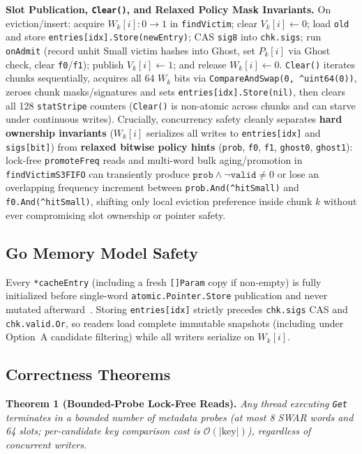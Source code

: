 \documentclass[11pt,a4paper]{article}
\begin{document}
\textbf{Slot Publication, \texttt{Clear()}, and Relaxed Policy Mask Invariants.} On eviction/insert: acquire $W_k[i]: 0 \to 1$ in \texttt{findVictim}; clear $V_k[i]\leftarrow 0$; load \texttt{old} and store \texttt{entries[idx].Store(newEntry)}; CAS \texttt{sig8} into \texttt{chk.sigs}; run \texttt{onAdmit} (record unhit Small victim hashes into Ghost, set $P_k[i]$ via Ghost check, clear \texttt{f0}/\texttt{f1}); publish $V_k[i]\leftarrow 1$; and release $W_k[i]\leftarrow 0$. \texttt{Clear()} iterates chunks sequentially, acquires all 64 $W_k$ bits via \texttt{CompareAndSwap(0, \textasciicircum uint64(0))}, zeroes chunk masks/signatures and sets \texttt{entries[idx].Store(nil)}, then clears all 128 \texttt{statStripe} counters (\texttt{Clear()} is non-atomic across chunks and can starve under continuous writes). Crucially, concurrency safety cleanly separates \textbf{hard ownership invariants} ($W_k[i]$ serializes all writes to \texttt{entries[idx]} and \texttt{sigs[bit]}) from \textbf{relaxed bitwise policy hints} (\texttt{prob}, \texttt{f0}, \texttt{f1}, \texttt{ghost0}, \texttt{ghost1}): lock-free \texttt{promoteFreq} reads and multi-word bulk aging/promotion in \texttt{findVictimS3FIFO} can transiently produce $\texttt{prob} \land \neg \texttt{valid} \ne 0$ or lose an overlapping frequency increment between \texttt{prob.And(\textasciicircum hitSmall)} and \texttt{f0.And(\textasciicircum hitSmall)}, shifting only local eviction preference inside chunk $k$ without ever compromising slot ownership or pointer safety.

\subsection{Go Memory Model Safety}
Every \texttt{*cacheEntry} (including a fresh \texttt{[]Param} copy if non-empty) is fully initialized before single-word \texttt{atomic.Pointer.Store} publication and never mutated afterward~\cite{gomem2024}. Storing \texttt{entries[idx]} strictly precedes \texttt{chk.sigs} CAS and \texttt{chk.valid.Or}, so readers load complete immutable snapshots (including under Option~A candidate filtering) while all writers serialize on $W_k[i]$.

\subsection{Correctness Theorems}

\textbf{Theorem 1 (Bounded-Probe Lock-Free Reads).} \textit{Any thread executing \texttt{Get} terminates in a bounded number of metadata probes (at most 8 SWAR words and 64 slots; per-candidate key comparison cost is $\mathcal{O}(|\text{key}|)$), regardless of concurrent writers.}
\end{document}

